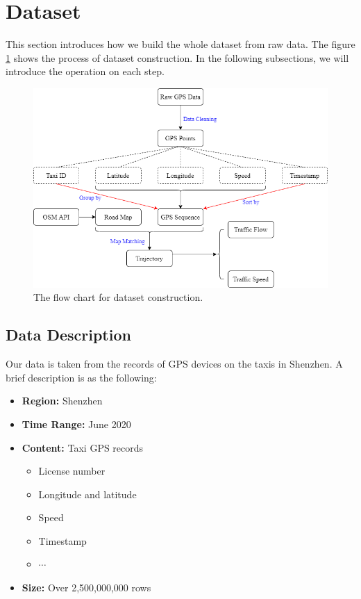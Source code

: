 
\section{Dataset}
This section introduces how we build the whole dataset from raw data. The figure \ref{fig: dataset_overview} shows the process of dataset construction. In the following subsections, we will introduce the operation on each step.

\begin{figure}[htb]
  \centering
  \includegraphics[width=\textwidth]{images/dataset_overview.drawio.png}
  \caption{The flow chart for dataset construction.}
  \label{fig: dataset_overview}
\end{figure}

\subsection{Data Description}
Our data is taken from the records of GPS devices on the taxis in Shenzhen. A brief description is as the following:
\begin{itemize}
    \item \textbf{Region:} Shenzhen
    \item \textbf{Time Range:} June 2020
    \item \textbf{Content:} Taxi GPS records
    \begin{itemize}
      \item License number
      \item Longitude and latitude
      \item Speed
      \item Timestamp
      \item $\cdots$
    \end{itemize}
  \item \textbf{Size:} Over 2,500,000,000 rows
\end{itemize}

